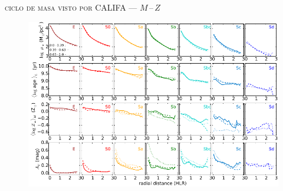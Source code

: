 \documentclass[xcolor=dvipsnames,4pt,hyperref={colorlinks,citecolor=black,linkcolor=black,urlcolor=black}]{beamer}
\begin{document}
\begin{frame}{\textsc{ciclo de masa visto por CALIFA --- $M\,$--$\,Z$}}

\begin{figure}
\includegraphics[scale=1]{img/gonzalez2015-17}
\end{figure}
\end{frame}
\end{document}
